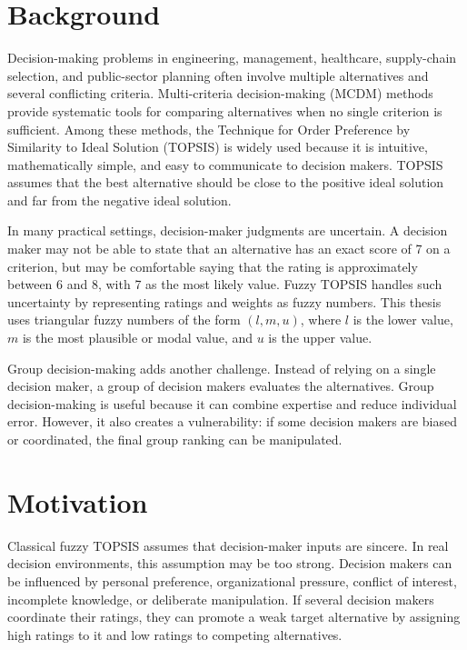 \section{Background}

Decision-making problems in engineering, management, healthcare, supply-chain selection, and public-sector planning often involve multiple alternatives and several conflicting criteria. Multi-criteria decision-making (MCDM) methods provide systematic tools for comparing alternatives when no single criterion is sufficient. Among these methods, the Technique for Order Preference by Similarity to Ideal Solution (TOPSIS) is widely used because it is intuitive, mathematically simple, and easy to communicate to decision makers. TOPSIS assumes that the best alternative should be close to the positive ideal solution and far from the negative ideal solution.

In many practical settings, decision-maker judgments are uncertain. A decision maker may not be able to state that an alternative has an exact score of 7 on a criterion, but may be comfortable saying that the rating is approximately between 6 and 8, with 7 as the most likely value. Fuzzy TOPSIS handles such uncertainty by representing ratings and weights as fuzzy numbers. This thesis uses triangular fuzzy numbers of the form \((l,m,u)\), where \(l\) is the lower value, \(m\) is the most plausible or modal value, and \(u\) is the upper value.

Group decision-making adds another challenge. Instead of relying on a single decision maker, a group of decision makers evaluates the alternatives. Group decision-making is useful because it can combine expertise and reduce individual error. However, it also creates a vulnerability: if some decision makers are biased or coordinated, the final group ranking can be manipulated.

\section{Motivation}

Classical fuzzy TOPSIS assumes that decision-maker inputs are sincere. In real decision environments, this assumption may be too strong. Decision makers can be influenced by personal preference, organizational pressure, conflict of interest, incomplete knowledge, or deliberate manipulation. If several decision makers coordinate their ratings, they can promote a weak target alternative by assigning high ratings to it and low ratings to competing alternatives.

